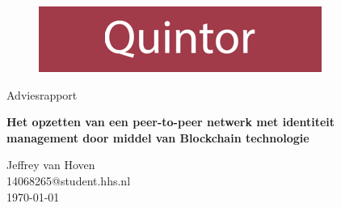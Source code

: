 \documentclass[a4paper,10pt]{article}
\begin{document}
  
  \begin{titlepage}
    \begin{figure}
      \includegraphics[width=\textwidth]{quintor}
      \vspace{1cm}    
    \end{figure}

    {\huge\centering Adviesrapport \par}
    \vspace{1cm}    
    {\large\bfseries\centering
      Het opzetten van een peer-to-peer netwerk met identiteit \\
      management door middel van Blockchain technologie
    \par}

    \vfill

    \begin{flushleft}
      Jeffrey van Hoven \\
      14068265@student.hhs.nl \\
      \today
    \end{flushleft}
  \end{titlepage}

  
  

  \newpage
  \tableofcontents

  
  
  
  
  
\end{document}
